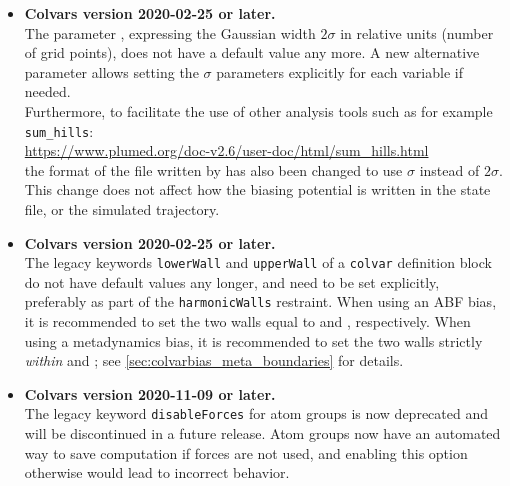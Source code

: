 \begin{itemize}
\item \textbf{Colvars version 2020-02-25 or later.}\\
  The parameter , expressing the Gaussian width $2\sigma$ in relative units (number of grid points), does not have a default value any more.
  A new alternative parameter  allows setting the $\sigma$ parameters explicitly for each variable if needed.\\
  Furthermore, to facilitate the use of other analysis tools such as for example \texttt{sum\_hills}:\\
\url{https://www.plumed.org/doc-v2.6/user-doc/html/sum_hills.html}\\
  the format of the file written by  has also been changed to use $\sigma$ instead of $2\sigma$.
  This change does not affect how the biasing potential is written in the state file, or the simulated trajectory.

\item \textbf{Colvars version 2020-02-25 or later.}\\
  The legacy keywords \texttt{lowerWall} and \texttt{upperWall} of a \texttt{colvar} definition block do not have default values any longer, and need to be set explicitly, preferably as part of the \texttt{harmonicWalls} restraint.
  When using an ABF bias, it is recommended to set the two walls equal to  and , respectively.
  When using a metadynamics bias, it is recommended to set the two walls strictly \emph{within}  and ; see \ref{sec:colvarbias_meta_boundaries} for details.

\item \textbf{Colvars version 2020-11-09 or later.}\\
  The legacy keyword \texttt{disableForces} for atom groups is now deprecated and will be discontinued in a future release.
  Atom groups now have an automated way to save computation if forces are not used, and enabling this option otherwise would lead to incorrect behavior.

\end{itemize}


